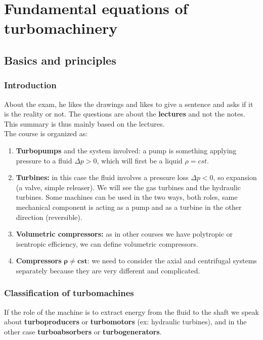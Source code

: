 
\chapter{Fundamental equations of turbomachinery}

\section{Basics and principles}
\subsection{Introduction}
	About the exam, he likes the drawings and likes to give a sentence and asks if it is the reality or not. The questions are about the \textbf{lectures} and not the notes. This summary is thus mainly based on the lectures. \\

The course is organized as: 

\begin{enumerate}
\item \textbf{Turbopumps} and the system involved: a pump is something  applying pressure to a fluid $\Delta p > 0$, which will first be a liquid $\rho = cst$.

\item \textbf{Turbines:} in this case the fluid involves a pressure loss $\Delta p < 0$, so expansion (a valve, simple releaser). We will see the gas turbines and the hydraulic turbines. Some machines can be used in the two ways, both roles, same mechanical component is acting as a pump and as a turbine in the other direction (reversible). 

\item \textbf{Volumetric compressors:} as in other courses we have polytropic or isentropic efficiency, we can define volumetric compressors. 

\item \textbf{Compressors} $\bm{\rho \neq cst}$: we need to consider the axial and centrifugal systems separately because they are very different and complicated.   
\end{enumerate}


\subsection{Classification of turbomachines}
If the role of the machine is to extract energy from the fluid to the shaft we speak about \textbf{turboproducers} or \textbf{turbomotors} (ex: hydraulic turbines), and in the other case \textbf{turboabsorbers} or \textbf{turbogenerators}. 

